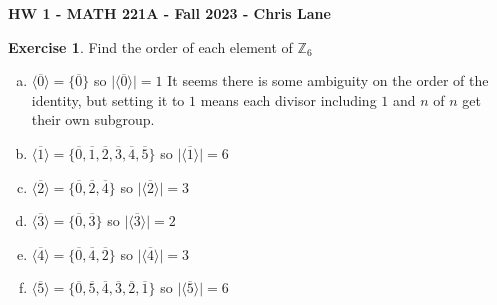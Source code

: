 \documentclass[11pt,oneside]{article}
\numberwithin{equation}{section}
\theoremstyle{definition}
\newtheorem{exercise}{Exercise}
\begin{document}
\textbf{HW 1 - MATH 221A - Fall 2023 - Chris Lane}

\begin{exercise}
Find the order of each element of $ \mathbb{Z} _ 6 $
\end{exercise}

\begin{solution}
\begin{enumerate}[(a)]
\item 
    $ \langle \overline 0 \rangle  = \{ \overline 0 \} $ so $ \lvert \langle \overline 0 \rangle \rvert = 1 $ It seems there is some ambiguity on the order of the identity, but setting it to $ 1 $ means each divisor including $1$ and $n$ of $n$ get their own subgroup.  
  \item
    $ \langle \overline 1 \rangle  = \{ \overline 0, \overline 1, \overline 2, \overline 3, \overline 4, \overline 5 \} $ so $ \lvert \langle \overline 1 \rangle \rvert = 6 $
  \item
    $ \langle \overline 2 \rangle  = \{ \overline 0, \overline  2, \overline  4 \} $ so $ \lvert \langle \overline 2 \rangle \rvert = 3 $
  \item
    $ \langle \overline 3 \rangle  = \{ \overline 0, \overline  3 \} $ so $ \lvert \langle \overline 3 \rangle \rvert = 2 $
  \item
    $ \langle \overline 4 \rangle  = \{ \overline 0, \overline  4, \overline  2 \} $ so $ \lvert \langle \overline 4 \rangle \rvert = 3 $
  \item
    $ \langle \overline 5 \rangle  = \{ \overline 0 , \overline 5 , \overline 4 , \overline 3 , \overline 2 , \overline 1 \} $ so $ \lvert \langle \overline 5 \rangle \rvert = 6 $
\end{enumerate}
\end{solution}
\end{document}
